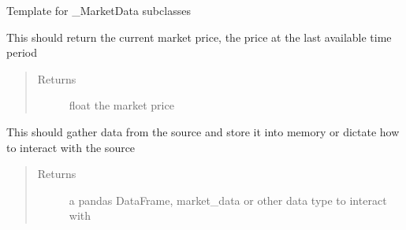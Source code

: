\documentclass[letterpaper,10pt,english]{sphinxmanual}
\begin{document}
\begin{fulllineitems}
\label{\detokenize{market_data:risk_dash.market_data._MarketData}}
\sphinxAtStartPar
Template for \_MarketData subclasses

\begin{fulllineitems}
\label{\detokenize{market_data:risk_dash.market_data._MarketData.current_price}}
\sphinxAtStartPar
This should return the current market price, the price at the last available time period
\begin{quote}\begin{description}
\item[{Returns}] \leavevmode
\sphinxAtStartPar
float the market price

\end{description}\end{quote}

\end{fulllineitems}


\begin{fulllineitems}
\label{\detokenize{market_data:risk_dash.market_data._MarketData.gather}}
\sphinxAtStartPar
This should gather data from the source and store it into memory or dictate how to interact with the source
\begin{quote}\begin{description}
\item[{Returns}] \leavevmode
\sphinxAtStartPar
a pandas DataFrame, market\_data or other data type to interact with

\end{description}\end{quote}

\end{fulllineitems}


\end{fulllineitems}

\end{document}
